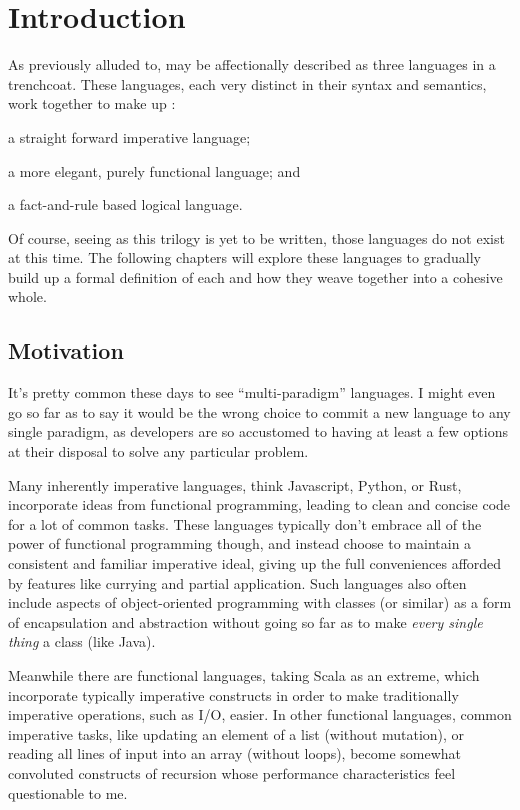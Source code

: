 \section{Introduction}

As previously alluded to, \Trilogy{} may be affectionally  described
as three languages in a trenchcoat. These languages, each very distinct in
their syntax and semantics, work together to make up \Trilogy{}:

\begin{description}[labelindent=1.5em]
    \item[Prose] a straight forward imperative language;
    \item[Poetry] a more elegant, purely functional language; and
    \item[Law] a fact-and-rule based logical language.
\end{description}

\noindent
Of course, seeing as this trilogy is yet to be written, those languages do not
exist at this time. The following chapters will explore these languages to
gradually build up a formal definition of each and how they weave together
into a cohesive whole.

\subsection{Motivation}

It's pretty common these days to see ``multi-paradigm'' languages. I might even
go so far as to say it would be the wrong choice to commit a new language to
any single paradigm, as developers are so accustomed to having at least a few
options at their disposal to solve any particular problem.

Many inherently imperative languages, think Javascript, Python, or Rust,
incorporate ideas from functional programming, leading to clean and concise
code for a lot of common tasks. These languages typically don't embrace
all of the power of functional programming though, and instead choose to
maintain a consistent and familiar imperative ideal, giving up the full
conveniences afforded by features like currying and partial application.
Such languages also often include aspects of object-oriented programming
with classes (or similar) as a form of encapsulation and abstraction
without going so far as to make \emph{every single thing} a class (like Java).

Meanwhile there are functional languages, taking Scala as an extreme, which
incorporate typically imperative constructs in order to make traditionally
imperative operations, such as I/O, easier. In other functional languages, common
imperative tasks, like updating an element of a list (without mutation), or
reading all lines of input into an array (without loops), become somewhat
convoluted constructs of recursion whose performance characteristics feel
questionable to me.


